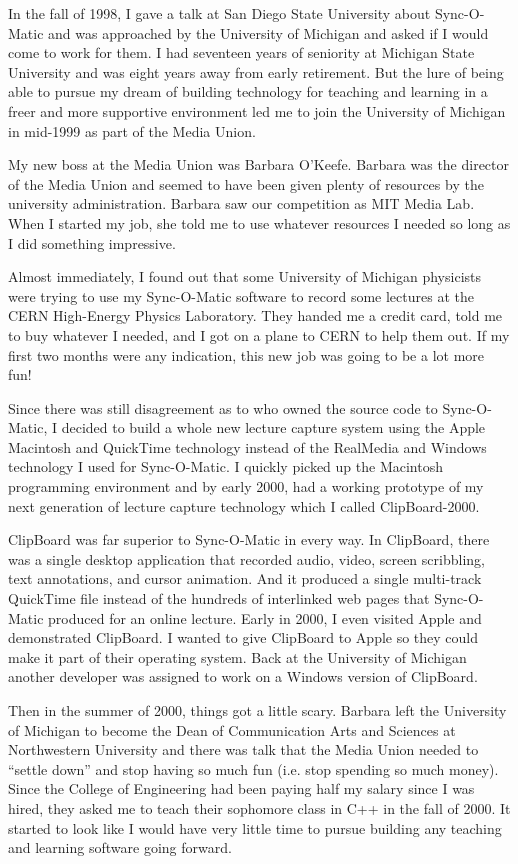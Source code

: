 \documentclass[12pt]{book}
\begin{document}
In the fall of 1998, I gave a talk at San Diego State University
about Sync-O-Matic and was approached by the University of Michigan
and asked if I would come to work for them.  I had seventeen years
of seniority at Michigan State University and was eight years away
from early retirement.  But the lure of being able to pursue
my dream of building technology for teaching and learning in a
freer and more supportive environment led me to join the University
of Michigan in mid-1999 as part of the Media Union.

My new boss at the Media Union was Barbara O'Keefe.
Barbara was the director of the Media Union and seemed to have been
given plenty of resources by
the university administration.  Barbara saw our competition as
MIT Media Lab.  When I started my job, she told me
to use whatever resources I needed so long as I did
something impressive.

Almost immediately, I found out that some University
of Michigan physicists were trying to use my Sync-O-Matic software
to record some lectures at the CERN High-Energy Physics Laboratory.
They handed me a credit card, told me to buy whatever I needed,
and I got on a plane to CERN to help them out.
If my first two months were any indication, this new job
was going to be a lot more fun!

Since there was still disagreement as to who owned the source code to
Sync-O-Matic, I decided to build a whole new lecture capture system
using the Apple Macintosh and QuickTime technology instead of the RealMedia
and Windows technology I used for Sync-O-Matic.  I quickly picked
up the Macintosh programming environment and by early 2000,
had a working prototype of my next generation of lecture capture
technology which I called ClipBoard-2000.

ClipBoard was far superior to Sync-O-Matic in every way.  In ClipBoard,
there was a single desktop application that recorded audio, video,
screen scribbling, text annotations, and cursor animation.
And it produced a single multi-track QuickTime file instead of
the hundreds of interlinked web pages that Sync-O-Matic produced
for an online lecture.  Early in 2000, I even visited Apple and
demonstrated ClipBoard.  I wanted to give ClipBoard to Apple so they could
make it part of their operating system.  Back at the University
of Michigan another developer was assigned to work on a Windows
version of ClipBoard.

Then in the summer of 2000, things got a little scary.
Barbara left the University of Michigan to become the
Dean of Communication Arts and Sciences at
Northwestern University and there was talk that the Media Union
needed to ``settle down'' and stop having so much fun (i.e. stop
spending so much money).  Since the College of Engineering had
been paying half my salary since I was hired, they asked me to
teach their sophomore class in C++ in the fall of 2000.  It started
to look like I would have very little time to pursue building
any teaching and learning software going forward.
\end{document}
